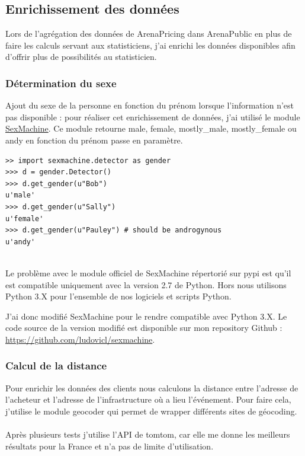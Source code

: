 \subsection{Enrichissement des données}
Lors de l'agrégation des données de ArenaPricing dans ArenaPublic en plus de faire les calculs servant aux statisticiens, j'ai enrichi les données disponibles afin d'offrir plus de possibilités au statisticien.
\subsubsection{Détermination du sexe}
Ajout du sexe de la personne en fonction du prénom lorsque l'information n'est pas disponible : pour réaliser cet enrichissement de données, j'ai utilisé le module 
\href{https://github.com/ferhatelmas/sexmachine/}{SexMachine}.
Ce module retourne male, female, mostly\_male, mostly\_female ou andy en fonction du prénom passe en paramètre.

\lstset{style=custompython}
\begin{lstlisting}
>> import sexmachine.detector as gender
>>> d = gender.Detector()
>>> d.get_gender(u"Bob")
u'male'
>>> d.get_gender(u"Sally")
u'female'
>>> d.get_gender(u"Pauley") # should be androgynous
u'andy'
\end{lstlisting}
\leavevmode \\
Le problème avec le module officiel de SexMachine répertorié sur pypi est qu'il est compatible uniquement avec la version 2.7 de Python. Hors nous utilisons Python 3.X pour l'ensemble de nos logiciels et scripts Python. 

J'ai donc modifié SexMachine pour le rendre compatible avec Python 3.X. Le code source de la version modifié est disponible sur mon repository Github : \href{https://github.com/ludovicl/sexmachine}{https://github.com/ludovicl/sexmachine}.

\subsubsection{Calcul de la distance}

Pour enrichir les données des clients nous calculons la distance entre l'adresse de l'acheteur et l'adresse de l'infrastructure où a lieu l'événement.
Pour faire cela, j'utilise le module geocoder qui permet de wrapper différents sites de géocoding.
\\ \\
Après plusieurs tests j'utilise l'API de tomtom, car elle me donne les meilleurs résultats pour la France et n'a pas de limite d'utilisation.

